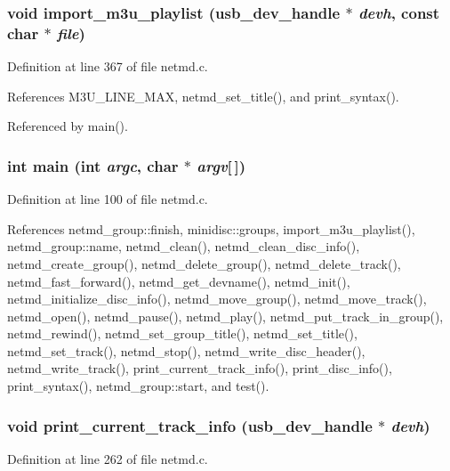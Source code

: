 \subsubsection[{import\_\-m3u\_\-playlist}]{\setlength{\rightskip}{0pt plus 5cm}void import\_\-m3u\_\-playlist (usb\_\-dev\_\-handle $\ast$ {\em devh}, \/  const char $\ast$ {\em file})}\label{netmd_8c_acfa3695c9f9d89132396ac7b4e12e3ed}


Definition at line 367 of file netmd.c.

References M3U\_\-LINE\_\-MAX, netmd\_\-set\_\-title(), and print\_\-syntax().

Referenced by main().
\subsubsection[{main}]{\setlength{\rightskip}{0pt plus 5cm}int main (int {\em argc}, \/  char $\ast$ {\em argv}[$\,$])}\label{netmd_8c_a0ddf1224851353fc92bfbff6f499fa97}


Definition at line 100 of file netmd.c.

References netmd\_\-group::finish, minidisc::groups, import\_\-m3u\_\-playlist(), netmd\_\-group::name, netmd\_\-clean(), netmd\_\-clean\_\-disc\_\-info(), netmd\_\-create\_\-group(), netmd\_\-delete\_\-group(), netmd\_\-delete\_\-track(), netmd\_\-fast\_\-forward(), netmd\_\-get\_\-devname(), netmd\_\-init(), netmd\_\-initialize\_\-disc\_\-info(), netmd\_\-move\_\-group(), netmd\_\-move\_\-track(), netmd\_\-open(), netmd\_\-pause(), netmd\_\-play(), netmd\_\-put\_\-track\_\-in\_\-group(), netmd\_\-rewind(), netmd\_\-set\_\-group\_\-title(), netmd\_\-set\_\-title(), netmd\_\-set\_\-track(), netmd\_\-stop(), netmd\_\-write\_\-disc\_\-header(), netmd\_\-write\_\-track(), print\_\-current\_\-track\_\-info(), print\_\-disc\_\-info(), print\_\-syntax(), netmd\_\-group::start, and test().
\subsubsection[{print\_\-current\_\-track\_\-info}]{\setlength{\rightskip}{0pt plus 5cm}void print\_\-current\_\-track\_\-info (usb\_\-dev\_\-handle $\ast$ {\em devh})}\label{netmd_8c_aea4e4639caf5d93bdaf6a0222530f2b8}


Definition at line 262 of file netmd.c.

